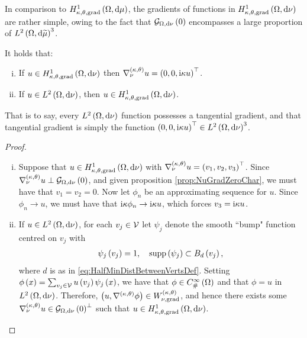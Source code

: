 In comparison to $H^1_{\kappa,\theta,\mathrm{grad}}\left( \Omega, \mathrm{d}\mu \right)$, the gradients of functions in $H^1_{\kappa,\theta,\mathrm{grad}}\left( \Omega, \mathrm{d}\nu \right)$ are rather simple, owing to the fact that $\mathcal{G}_{ \Omega, \mathrm{d}\nu}\left( 0 \right)$ encompasses a large proportion of $L^{2}\left( \Omega,\mathrm{d} \widetilde{\mu} \right)^3$.
\begin{cory} \label{cory:NuTangGradChar}
	It holds that:
	\begin{enumerate}[(i)]
		\item If $u\in H^1_{\kappa,\theta,\mathrm{grad}}\left( \Omega, \mathrm{d}\nu \right)$ then $\nabla^{\left( \kappa, \theta \right)}_{\nu}u = \left( 0,0,\mathrm{i}\kappa u \right)^\top$.
		\item If $u\in L^{2}\left( \Omega,\mathrm{d} \nu \right)$, then $u\in H^1_{\kappa,\theta,\mathrm{grad}}\left( \Omega, \mathrm{d}\nu \right)$.
	\end{enumerate}
\end{cory}
That is to say, every $L^{2}\left( \Omega,\mathrm{d} \nu \right)$ function possesses a tangential gradient, and that tangential gradient is simply the function $\left( 0,0,\mathrm{i}\kappa u \right)^\top\in L^{2}\left( \Omega,\mathrm{d} \nu \right)^3$.
\begin{proof}
	\begin{enumerate}[(i)]
		\item Suppose that $u\in H^1_{\kappa,\theta,\mathrm{grad}}\left( \Omega, \mathrm{d}\nu \right)$ with $\nabla^{\left( \kappa, \theta \right)}_{\nu}u = \left( v_1,v_2,v_3 \right)^\top$.
		Since $\nabla^{\left( \kappa, \theta \right)}_{\nu}u\perp\mathcal{G}_{ \Omega, \mathrm{d}\nu}\left( 0 \right)$, and given proposition \ref{prop:NuGradZeroChar}, we must have that $v_1 = v_2 = 0$.
		Now let $\phi_n$ be an approximating sequence for $u$.
		Since $\phi_n\rightarrow u$, we must have that $\mathrm{i}\kappa\phi_n\rightarrow\mathrm{i}\kappa u$, which forces $v_3 = \mathrm{i}\kappa u$.
		\item If $u\in L^{2}\left( \Omega,\mathrm{d} \nu \right)$, for each $v_j\in\mathcal{V}$ let $\psi_j$ denote the smooth ``bump" function centred on $v_j$ with
		\begin{align*}
			\psi_j\left( v_j \right) = 1, \quad \mathrm{supp}\left( \psi_j \right)\subset B_d\left( v_j \right),
		\end{align*}
		where $d$ is as in \eqref{eq:HalfMinDistBetweenVertsDef}.
		Setting $\phi\left( x \right) = \sum_{v_j\in\mathcal{V}}u\left( v_j \right)\psi_j\left( x \right)$, we have that $\phi\in C^{\infty}_{\#}\left( \Omega \right)$ and that $\phi = u$ in $L^{2}\left( \Omega,\mathrm{d} \nu \right)$.
		Therefore, $\left( u, \nabla^{\left( \kappa, \theta \right)}\phi \right)\in W^{\left( \kappa, \theta \right)}_{\nu,\mathrm{grad}}$, and hence there exists some $\nabla^{\left( \kappa, \theta \right)}_\nu u\in\mathcal{G}_{ \Omega, \mathrm{d}\nu}\left( 0 \right)^\perp$ such that $u\in H^1_{\kappa,\theta,\mathrm{grad}}\left( \Omega, \mathrm{d}\nu \right)$.
	\end{enumerate}
\end{proof}

